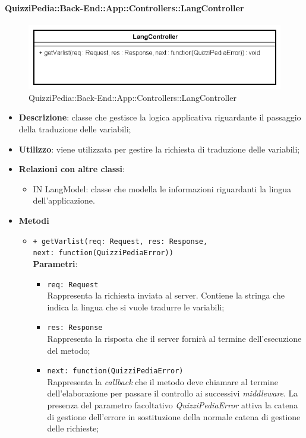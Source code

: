 \paragraph{QuizziPedia::Back-End::App::Controllers::LangController}
\label{QuizziPedia::Back-End::App::Controllers::UserController}
\begin{figure}[ht]
	\centering
	\includegraphics[scale=0.45]{UML/Classi/Back-End/QuizziPedia_Back-End_App_Controllers_langController.png}
	\caption{QuizziPedia::Back-End::App::Controllers::LangController}
\end{figure}
\FloatBarrier
\begin{itemize}
	\item 
	\textbf{Descrizione}:
	classe che gestisce la logica applicativa riguardante il passaggio della traduzione delle variabili;
	\item \textbf{Utilizzo}:
	viene utilizzata per gestire la richiesta di traduzione delle variabili;
	\item \textbf{Relazioni con altre classi}:
	\begin{itemize}
		\item IN LangModel: classe che modella le informazioni riguardanti la lingua dell'applicazione.
	\end{itemize}
	\item \textbf{Metodi}
		\begin{itemize}
			\item \texttt{+ getVarlist(req: Request, res: Response,\\ next: function(QuizziPediaError))} \\
			\textbf{Parametri}:
				\begin{itemize}
					\item \texttt{req: Request} \\
					Rappresenta la richiesta inviata al server. Contiene la stringa che indica la lingua che si vuole tradurre le variabili;
					\item \texttt{res: Response} \\
					Rappresenta la risposta che il server fornirà al termine  dell'esecuzione del metodo;
					\item \texttt{next: function(QuizziPediaError)} \\
					Rappresenta la \textit{callback} che il metodo deve chiamare al termine dell'elaborazione per passare il controllo ai successivi \textit{middleware}. La presenza del parametro facoltativo \textit{QuizziPediaError} attiva la catena di gestione dell'errore in sostituzione della normale catena di gestione delle richieste;
				\end{itemize}
		\end{itemize}
\end{itemize}
